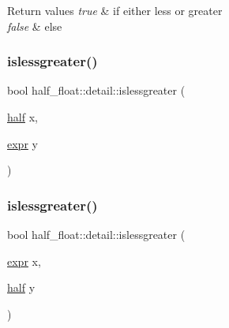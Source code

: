 \begin{DoxyRetVals}{Return values}
{\em true} & if either less or greater \\
\hline
{\em false} & else \\
\hline
\end{DoxyRetVals}
\mbox{\label{namespacehalf__float_1_1detail_abe2ef7f721b2153143e677f5382fa823}} 
\subsubsection{\texorpdfstring{islessgreater()}{islessgreater()}\hspace{0.1cm}{\footnotesize\ttfamily [2/4]}}
{\footnotesize\ttfamily bool half\+\_\+float\+::detail\+::islessgreater (\begin{DoxyParamCaption}\item[{\hyperlink{classhalf__float_1_1half}{half}}]{x,  }\item[{\hyperlink{structhalf__float_1_1detail_1_1expr}{expr}}]{y }\end{DoxyParamCaption})\hspace{0.3cm}{\ttfamily [inline]}}

\mbox{\label{namespacehalf__float_1_1detail_ae711abc410125d0b904d2d086d8e831c}} 
\subsubsection{\texorpdfstring{islessgreater()}{islessgreater()}\hspace{0.1cm}{\footnotesize\ttfamily [3/4]}}
{\footnotesize\ttfamily bool half\+\_\+float\+::detail\+::islessgreater (\begin{DoxyParamCaption}\item[{\hyperlink{structhalf__float_1_1detail_1_1expr}{expr}}]{x,  }\item[{\hyperlink{classhalf__float_1_1half}{half}}]{y }\end{DoxyParamCaption})\hspace{0.3cm}{\ttfamily [inline]}}

